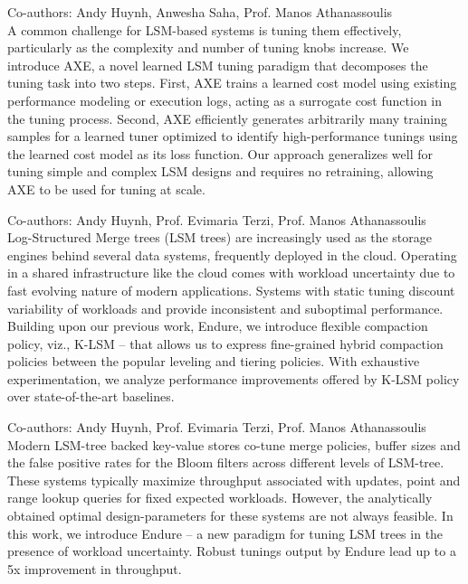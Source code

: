 \documentclass[10pt]{moderncv}
\begin{document}
{
    Co-authors: Andy Huynh, Anwesha Saha, Prof. Manos Athanassoulis\\
    A common challenge for LSM-based systems is tuning them effectively, particularly as the complexity and number
        of tuning knobs increase.
    We introduce AXE, a novel learned LSM tuning paradigm that decomposes the tuning task into two steps.
    First, AXE trains a learned cost model using existing performance modeling or execution logs, acting as a 
        surrogate cost function in the tuning process.
    Second, AXE efficiently generates arbitrarily many training samples for a learned tuner optimized to identify
        high-performance tunings using the learned cost model as its loss function.
    Our approach generalizes well for tuning simple and complex LSM designs and requires no retraining, 
        allowing AXE to be used for tuning at scale.
}

{
    Co-authors: Andy Huynh, Prof. Evimaria Terzi, Prof. Manos Athanassoulis\\
    Log-Structured Merge trees (LSM trees) are increasingly used as the storage engines behind several data systems,
        frequently deployed in the cloud. 
    Operating in a shared infrastructure like the cloud comes with workload uncertainty due to fast evolving nature of 
        modern applications. 
    Systems with static tuning discount variability of workloads and provide inconsistent and suboptimal performance. 
    Building upon our previous work, Endure, we introduce flexible compaction policy, viz., K-LSM -- that allows us to 
        express fine-grained hybrid compaction policies between the popular leveling and tiering policies. 
    With exhaustive experimentation, we analyze performance improvements offered by K-LSM policy over state-of-the-art 
        baselines.
}

{
    Co-authors: Andy Huynh, Prof. Evimaria Terzi, Prof. Manos Athanassoulis\\
    Modern LSM-tree backed key-value stores co-tune merge policies, buffer sizes and the false positive rates for the 
        Bloom filters across different levels of LSM-tree. 
    These systems typically maximize throughput associated with updates, point and range lookup queries for fixed 
        expected workloads. 
    However, the analytically obtained optimal design-parameters for these systems are not always feasible. 
    In this work, we introduce Endure -- a new paradigm for tuning LSM trees in the presence of workload uncertainty. 
    Robust tunings output by Endure lead up to a 5x improvement in throughput.
}
\end{document}
